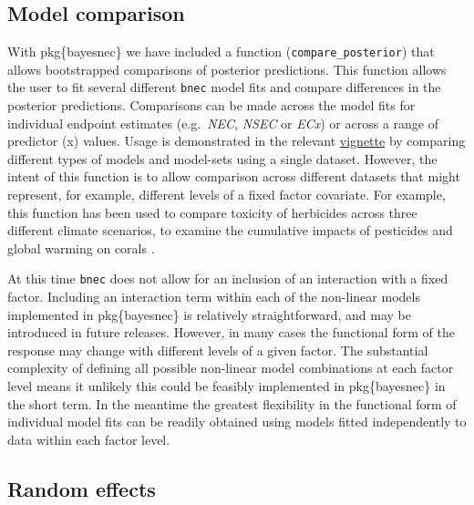 \documentclass[
]{jss}
\begin{document}
\hypertarget{model-comparison}{%
\subsection{Model comparison}\label{model-comparison}}

With pkg\{bayesnec\} we have included a function
(\texttt{compare\_posterior}) that allows bootstrapped comparisons of
posterior predictions. This function allows the user to fit several
different \texttt{bnec} model fits and compare differences in the
posterior predictions. Comparisons can be made across the model fits for
individual endpoint estimates (e.g.~\emph{NEC}, \emph{NSEC} or
\emph{ECx}) or across a range of predictor (x) values. Usage is
demonstrated in the relevant
\href{https://open-aims.github.io/bayesnec/articles/example4.html}{vignette}
by comparing different types of models and model-sets using a single
dataset. However, the intent of this function is to allow comparison
across different datasets that might represent, for example, different
levels of a fixed factor covariate. For example, this function has been
used to compare toxicity of herbicides across three different climate
scenarios, to examine the cumulative impacts of pesticides and global
warming on corals \citep{flores2021}.

At this time \texttt{bnec} does not allow for an inclusion of an
interaction with a fixed factor. Including an interaction term within
each of the non-linear models implemented in pkg\{bayesnec\} is
relatively straightforward, and may be introduced in future releases.
However, in many cases the functional form of the response may change
with different levels of a given factor. The substantial complexity of
defining all possible non-linear model combinations at each factor level
means it unlikely this could be feasibly implemented in pkg\{bayesnec\}
in the short term. In the meantime the greatest flexibility in the
functional form of individual model fits can be readily obtained using
models fitted independently to data within each factor level.

\hypertarget{random-effects}{%
\subsection{Random effects}\label{random-effects}}
\end{document}

